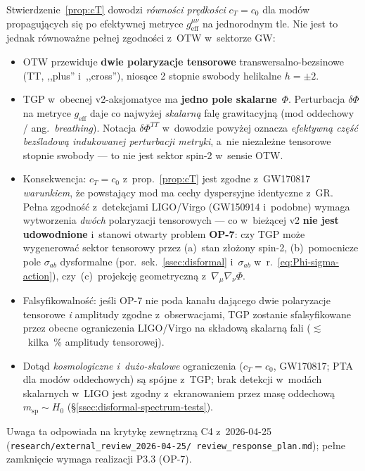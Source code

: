 \begin{remark}%
\label{rem:GW-scope-2026}
Stwierdzenie~\ref{prop:cT} dowodzi \emph{r\'owno\'sci pr\k{e}dko\'sci}
$c_T = c_0$ dla mod\'ow propaguj\k{a}cych si\k{e} po efektywnej
metryce $g_{\mathrm{eff}}^{\mu\nu}$ na jednorodnym tle. Nie
jest to jednak r\'ownowa\.zne pe\l{}nej zgodno\'sci z~OTW
w~sektorze GW:
\begin{itemize}[nosep]
  \item OTW przewiduje \textbf{dwie polaryzacje tensorowe}
    transwersalno-bezsinowe (TT, ,,plus'' i~,,cross''),
    nios\k{a}ce 2 stopnie swobody helikalne $h = \pm 2$.
  \item TGP w~obecnej v2-aksjomatyce ma \textbf{jedno pole
    skalarne}~$\Phi$. Perturbacja $\delta\Phi$ na metryce
    $g_{\mathrm{eff}}$ daje co najwy\.zej \emph{skalarn\k{a}}
    fal\k{e} grawitacyjn\k{a} (mod oddechowy / ang.\ \emph{breathing}).
    Notacja $\delta\Phi^{TT}$ w~dowodzie powy\.zej oznacza
    \emph{efektywn\k{a} cz\k{e}\'s\'c bez\'sladow\k{a} indukowanej
    perturbacji metryki}, a~nie niezale\.zne tensorowe stopnie
    swobody --- to nie jest sektor spin-2 w~sensie OTW.
  \item Konsekwencja: $c_T = c_0$ z~prop.~\ref{prop:cT} jest
    zgodne z~GW170817 \emph{warunkiem}, \.ze powstaj\k{a}cy mod
    ma cechy dyspersyjne identyczne z~GR. Pe\l{}na zgodno\'s\'c
    z~detekcjami LIGO/Virgo (GW150914 i~podobne) wymaga
    wytworzenia \emph{dw\'och} polaryzacji tensorowych --- co
    w~bie\.z\k{a}cej v2 \textbf{nie jest udowodnione} i~stanowi
    otwarty problem \textbf{OP-7}: czy TGP mo\.ze wygenerowa\'c
    sektor tensorowy przez (a)~stan z\l{}o\.zony spin-2,
    (b)~pomocnicze pole $\sigma_{ab}$ dy\-sfor\-mal\-ne
    (por.~sek.~\ref{ssec:disformal} i~$\sigma_{ab}$
    w~r.~\eqref{eq:Phi-sigma-action}), czy~(c)~projekcj\k{e}
    geometryczn\k{a} z~$\nabla_\mu\nabla_\nu\Phi$.
  \item Falsyfikowalno\'s\'c: je\'sli OP-7 nie poda kana\l{}u
    daj\k{a}cego dwie polaryzacje tensorowe \emph{i} amplitudy
    zgodne z~obserwacjami, TGP zostanie sfalsyfikowane przez
    obecne ograniczenia LIGO/Virgo na sk\l{}adow\k{a} skalarn\k{a}
    fali ($\lesssim$~kilka~\% amplitudy tensorowej).
  \item Dot\k{a}d \emph{kosmologiczne i~du\.zo-skalowe} ograniczenia
    ($c_T = c_0$, GW170817; PTA dla mod\'ow oddechowych) s\k{a}
    sp\'ojne z~TGP; brak detekcji w~mod\'ach skalarnych w~LIGO
    jest zgodny z~ekranowaniem przez mas\k{e} oddechow\k{a}
    $m_{\mathrm{sp}} \sim H_0$
    (\S\ref{ssec:disformal-spectrum-tests}).
\end{itemize}
Uwaga ta odpowiada na krytyk\k{e} zewn\k{e}trzn\k{a} C4
z~2026-04-25 (\texttt{research/external\_review\_2026-04-25/%
review\_response\_plan.md}); pe\l{}ne zamkni\k{e}cie wymaga
realizacji P3.3 (OP-7).
\end{remark}

